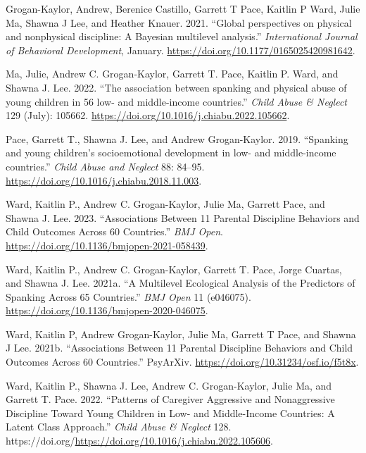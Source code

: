 \documentclass[
  letterpaper,
  DIV=11,
  numbers=noendperiod]{scrartcl}
\newlength{\cslhangindent}
\newlength{\cslentryspacingunit} %
\newenvironment{CSLReferences}[2] %
 {%
  \setlength{\parindent}{0pt}
  \ifodd #1
  \let\oldpar\par
  \def\par{\hangindent=\cslhangindent\oldpar}
  \fi
  \setlength{\parskip}{#2\cslentryspacingunit}
 }%
 {}
\begin{document}
\hypertarget{refs}{}
\begin{CSLReferences}{1}{0}
\leavevmode{}%
Grogan-Kaylor, Andrew, Berenice Castillo, Garrett T Pace, Kaitlin P
Ward, Julie Ma, Shawna J Lee, and Heather Knauer. 2021. {``{Global
perspectives on physical and nonphysical discipline: A Bayesian
multilevel analysis}.''} \emph{International Journal of Behavioral
Development}, January. \url{https://doi.org/10.1177/0165025420981642}.

\leavevmode{}%
Ma, Julie, Andrew C. Grogan-Kaylor, Garrett T. Pace, Kaitlin P. Ward,
and Shawna J. Lee. 2022. {``{The association between spanking and
physical abuse of young children in 56 low- and middle-income
countries}.''} \emph{Child Abuse \& Neglect} 129 (July): 105662.
\url{https://doi.org/10.1016/j.chiabu.2022.105662}.

\leavevmode{}%
Pace, Garrett T., Shawna J. Lee, and Andrew Grogan-Kaylor. 2019.
{``{Spanking and young children's socioemotional development in low- and
middle-income countries}.''} \emph{Child Abuse and Neglect} 88: 84--95.
\url{https://doi.org/10.1016/j.chiabu.2018.11.003}.

\leavevmode{}%
Ward, Kaitlin P., Andrew C. Grogan-Kaylor, Julie Ma, Garrett Pace, and
Shawna J. Lee. 2023. {``Associations Between 11 Parental Discipline
Behaviors and Child Outcomes Across 60 Countries.''} \emph{BMJ Open}.
\url{https://doi.org/10.1136/bmjopen-2021-058439}.

\leavevmode{}%
Ward, Kaitlin P., Andrew C. Grogan-Kaylor, Garrett T. Pace, Jorge
Cuartas, and Shawna J. Lee. 2021a. {``{A Multilevel Ecological Analysis
of the Predictors of Spanking Across 65 Countries}.''} \emph{BMJ Open}
11 (e046075). \url{https://doi.org/10.1136/bmjopen-2020-046075}.

\leavevmode{}%
Ward, Kaitlin P, Andrew Grogan-Kaylor, Julie Ma, Garrett T Pace, and
Shawna J Lee. 2021b. {``Associations Between 11 Parental Discipline
Behaviors and Child Outcomes Across 60 Countries.''} PsyArXiv.
\url{https://doi.org/10.31234/osf.io/f5t8x}.

\leavevmode{}%
Ward, Kaitlin P., Shawna J. Lee, Andrew C. Grogan-Kaylor, Julie Ma, and
Garrett T. Pace. 2022. {``{Patterns of Caregiver Aggressive and
Nonaggressive Discipline Toward Young Children in Low- and Middle-Income
Countries: A Latent Class Approach}.''} \emph{Child Abuse \& Neglect}
128. https://doi.org/\url{https://doi.org/10.1016/j.chiabu.2022.105606}.

\end{CSLReferences}
\end{document}

